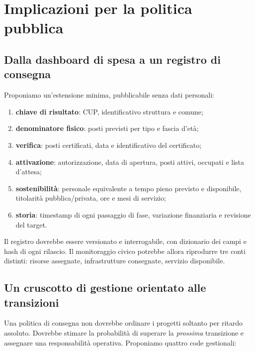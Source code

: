 \documentclass[10pt,a4paper]{article}
\begin{document}
\section{Implicazioni per la politica pubblica}

\subsection{Dalla dashboard di spesa a un registro di consegna}

Proponiamo un'estensione minima, pubblicabile senza dati personali:

\begin{enumerate}
  \item \textbf{chiave di risultato}: CUP, identificativo struttura e comune;
  \item \textbf{denominatore fisico}: posti previsti per tipo e fascia d'età;
  \item \textbf{verifica}: posti certificati, data e identificativo del certificato;
  \item \textbf{attivazione}: autorizzazione, data di apertura, posti attivi, occupati e lista d'attesa;
  \item \textbf{sostenibilità}: personale equivalente a tempo pieno previsto e disponibile, titolarità pubblica/privata, ore e mesi di servizio;
  \item \textbf{storia}: timestamp di ogni passaggio di fase, variazione finanziaria e revisione del target.
\end{enumerate}

Il registro dovrebbe essere versionato e interrogabile, con dizionario dei campi e hash di ogni rilascio. Il monitoraggio civico potrebbe allora riprodurre tre conti distinti: risorse assegnate, infrastrutture consegnate, servizio disponibile.

\subsection{Un cruscotto di gestione orientato alle transizioni}

Una politica di consegna non dovrebbe ordinare i progetti soltanto per ritardo assoluto. Dovrebbe stimare la probabilità di superare la \emph{prossima} transizione e assegnare una responsabilità operativa. Proponiamo quattro code gestionali:
\end{document}
